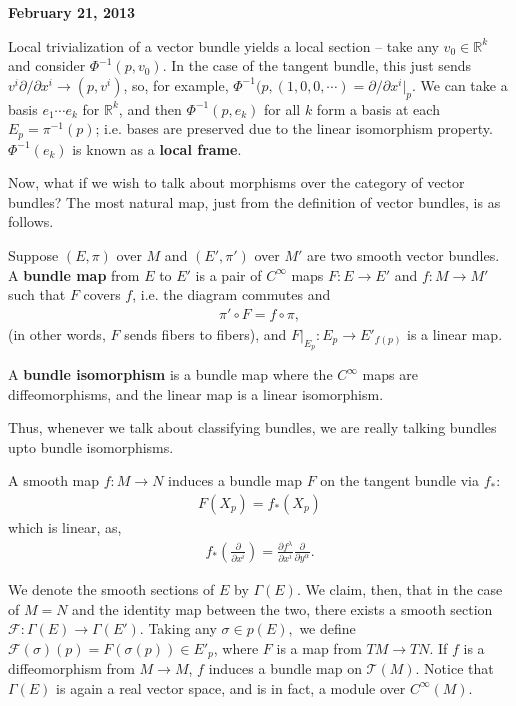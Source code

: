 \documentclass{../mathnotes}
\begin{document}
\textbf{February 21, 2013}

Local trivialization of a vector bundle yields a local section -- take any $v_0\in \mathbb{R}^k$ and consider $\Phi^{-1}(p,v_0)$. In the
case of the tangent bundle, this just sends $v^i\partial/\partial x^i\to (p,v^i)$, so, for example, $\Phi^{-1}(p,(1,0,0,\cdots)=\partial/\partial x^i|_p$.
We can take a basis $e_1\cdots e_k$ for $\mathbb{R}^k$, and then $\Phi^{-1}(p,e_k)$ for all $k$ form a basis at each $E_p=\pi^{-1}(p)$; i.e. bases
are preserved due to the linear isomorphism property. $\Phi^{-1}(e_k)$ is known as a \textbf{local frame}.

Now, what if we wish to talk about morphisms over the category of vector bundles? The most natural map, just from the definition of vector
bundles, is as follows.

\begin{defn}
    Suppose $(E,\pi)$ over $M$ and $(E',\pi')$ over $M'$ are two smooth vector bundles. A \textbf{bundle map} from $E$ to $E'$ is
    a pair of $C^\infty$ maps $F:E\to E'$ and $f:M\to M'$ such that $F$ covers $f$, i.e. the diagram commutes and
    \begin{align*}
        \pi'\circ F=f\circ \pi,
    \end{align*}
    (in other words, $F$ sends fibers to fibers), and $F|_{E_p}:E_p\to E'_{f(p)}$ is a linear map.

    A \textbf{bundle isomorphism} is a bundle map where the $C^\infty$ maps are diffeomorphisms, and the linear map is a linear isomorphism.
\end{defn}
Thus, whenever we talk about classifying bundles, we are really talking bundles upto bundle isomorphisms.

\begin{exmp}
    A smooth map $f:M\to N$ induces a bundle map $F$ on the tangent bundle via $f_*$:
    \begin{align*}
        F(X_p)=f_*(X_p)
    \end{align*}
    which is linear, as,
    \begin{align*}
        f_*\left(\frac{\partial}{\partial x^i}\right)=\frac{\partial f^\lambda}{\partial x^i}\frac{\partial}{\partial y^\alpha}.
    \end{align*}
\end{exmp}

We denote the smooth sections of $E$ by $\Gamma(E)$. We claim, then, that in the case of $M=N$ and the identity map between the two,
there exists a smooth section $\mathcal{F}:\Gamma(E)\to\Gamma(E')$. Taking any $\sigma\in p(E),$ we define $\mathcal{F}(\sigma)(p)=F(\sigma(p))\in E'_p$,
where $F$ is a map from $TM\to TN$.
If $f$ is a diffeomorphism from $M\to M$, $f$ induces a bundle map on $\mathcal{T}(M)$.
Notice that $\Gamma(E)$ is again a real vector space, and is in fact, a module over $C^\infty(M)$.
\end{document}
